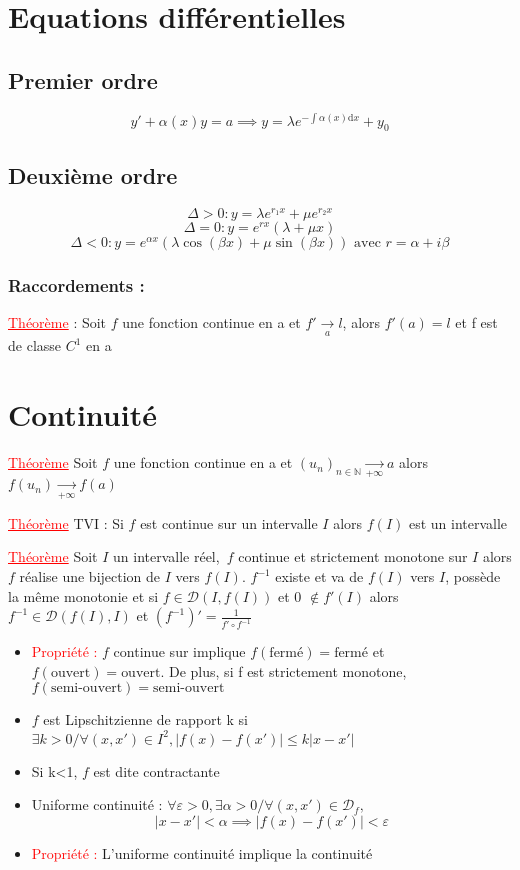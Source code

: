 \documentclass[a4paper, french]{article}
\newcommand{\N}{\mathbb{N}}
\newcommand{\D}{\mathcal{D}}
\newcommand{\dx}{\mathrm{d}x}
\newcommand{\al}{\alpha}
\newcommand{\be}{\beta}
\newcommand{\De}{\Delta}
\newcommand{\la}{\lambda}
\newcommand{\ep}{\varepsilon}
\newcommand{\thm}{\textcolor{red}{\underline{Théorème} }}
\newcommand{\ppt}{\textcolor{red}{Propriété : }}
\newcommand{\limit}[1]{\underset{#1}{\rightarrow}}
\newcommand{\inv}[1]{\frac{1}{#1}}
\begin{document}
	\section{Equations différentielles}
	\subsection*{Premier ordre}
	\[ y'+\al(x)y=a \implies y=\la e^{-\int{\al(x)\dx}}+y_0 \]
	\subsection*{Deuxième ordre}
	\[ \De > 0 : y=\la e^{r_1x}+\mu e^{r_2x} \]
	\[ \De = 0 : y=e^{rx}(\la+\mu x) \]
	\[ \De < 0 : y=e^{\al x}(\la \cos(\be x) + \mu \sin(\be x)) \text{ avec } r=\al + i\be\]

	\subsubsection*{Raccordements :}
	\thm : Soit $f$ une fonction continue en a et $f' \limit{a} l$, alors $f'(a)=l$ et f est de classe $C^1$ en a

	\section{Continuité}
	 \thm Soit $f$ une fonction continue en a et $(u_n)_{n \in \N}\limit{+\infty}a$ alors $f(u_n)\limit{+\infty}f(a)$
	 
	 \thm TVI : Si $f$ est continue sur un intervalle $I$ alors $f(I)$ est un intervalle 
	 
	 \thm Soit $I$ un intervalle réel,\, $f$ continue et strictement monotone sur $I$ alors $f$ réalise une bijection de $I$ vers \(f(I)\). \(f^{-1}\) existe et va de $f(I)$ vers $I$, possède la même monotonie et si $f\in \D(I,f(I))$ et 0 $\notin f'(I)$ alors $f^{-1} \in \D(f(I),I)$ et $(f^{-1})'=\inv{f'\circ f^{-1}}$
	\begin{itemize}[label=\(\bullet\)]
	 \item \ppt $f$ continue sur implique $f(\text{fermé})=\text{fermé}$ et \(f(\text{ouvert})=\text{ouvert}\). De plus, si f est strictement monotone, $f(\text{semi-ouvert})=\text{semi-ouvert}$
	  \item $f$ est Lipschitzienne de rapport k si $\exists k>0 / \forall (x,x') \in I^2, |f(x)-f(x')|\leqslant k|x-x'|$
	  \item Si k<1, $f$ est dite contractante
	  \item Uniforme continuité : $\forall \ep>0,\exists \al>0/ \forall(x,x') \in \D_f,$
			$$|x-x'|<\al \implies |f(x)-f(x')|<\ep$$
	\item \ppt L'uniforme continuité implique la continuité
	\end{itemize}
\end{document}
